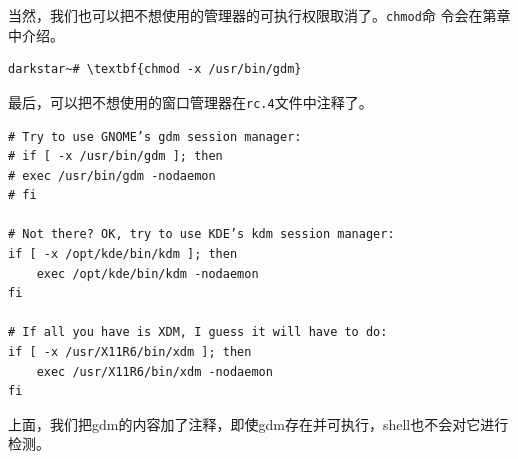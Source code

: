 当然，我们也可以把不想使用的管理器的可执行权限取消了。\texttt{chmod}命
令会在第章中介绍。%
\begin{Verbatim}[frame=single, commandchars=\\\{\}]
darkstar~# \textbf{chmod -x /usr/bin/gdm}
\end{Verbatim}

最后，可以把不想使用的窗口管理器在\texttt{rc.4}文件中注释了。
\begin{Verbatim}[frame=single, commandchars=\\\{\}]
# Try to use GNOME’s gdm session manager:
# if [ -x /usr/bin/gdm ]; then
# exec /usr/bin/gdm -nodaemon
# fi

# Not there? OK, try to use KDE’s kdm session manager:
if [ -x /opt/kde/bin/kdm ]; then
    exec /opt/kde/bin/kdm -nodaemon
fi

# If all you have is XDM, I guess it will have to do:
if [ -x /usr/X11R6/bin/xdm ]; then
    exec /usr/X11R6/bin/xdm -nodaemon
fi
\end{Verbatim}
上面，我们把gdm的内容加了注释，即使gdm存在并可执行，shell也不会对它进行
检测。
